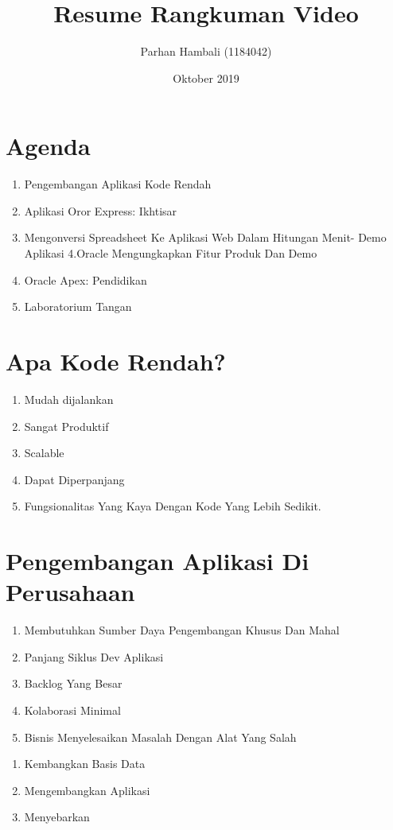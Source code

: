\documentclass{article}
\title{Resume Rangkuman Video}
\author{Parhan Hambali (1184042) }
\date{Oktober 2019}
\begin{document}
\maketitle
\section{Agenda}
\begin{enumerate}
    \item Pengembangan Aplikasi Kode Rendah
    \item Aplikasi Oror Express: Ikhtisar
    \item Mengonversi Spreadsheet Ke Aplikasi Web Dalam Hitungan Menit- Demo Aplikasi 4.Oracle Mengungkapkan Fitur Produk Dan Demo
    \item Oracle Apex: Pendidikan 
    \item Laboratorium Tangan
\end{enumerate}

\section{Apa Kode Rendah?}
\begin{enumerate}
    \item Mudah dijalankan
    \item Sangat Produktif
    \item Scalable
    \item Dapat Diperpanjang
    \item Fungsionalitas Yang Kaya Dengan Kode Yang Lebih Sedikit.
\end{enumerate}

\section{Pengembangan Aplikasi Di Perusahaan}
\begin{enumerate}
     \item Membutuhkan Sumber Daya Pengembangan Khusus Dan Mahal
    \item Panjang Siklus Dev Aplikasi
    \item Backlog Yang Besar
    \item Kolaborasi Minimal
    \item Bisnis Menyelesaikan Masalah Dengan Alat Yang Salah
\end{enumerate}
\newpage
 \usepackage{Oracle Apex:}
 \begin{enumerate}
     \item Kembangkan Basis Data
     \item Mengembangkan Aplikasi
     \item Menyebarkan
 \end{enumerate}
 
\end{document}
